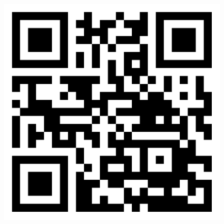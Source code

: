 \documentclass[margin,line]{resume}
\begin{document}
\begin{figure}[b]
\hfill \includegraphics[scale=2.0]{qr}
\end{figure}
\end{document}
